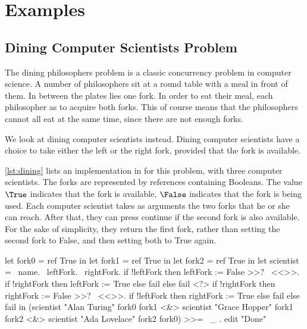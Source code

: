 
\section{Examples}
\label{sec:examples}

\subsection{Dining Computer Scientists Problem}

The dining philosophers problem is a classic concurrency problem in computer science.
A number of philosophers sit at a round table with a meal in front of them.
In between the plates lies one fork.
In order to eat their meal, each philosopher as to acquire both forks.
This of course means that the philosophers cannot all eat at the same time, since there are not enough forks.

We look at dining computer scientists instead.
Dining computer scientists have a choice to take either the left or the right fork, provided that the fork is available.

\cref{lst:dining} lists an implementation in \TOPHAT for this problem, with three computer scientists.
The forks are represented by references containing Booleans.
The value $\True$ indicates that the fork is available,
$\False$ indicates that the fork is being used.
Each computer scientist takes as arguments the two forks that he or she can reach.
After that, they can press continue if the second fork is also available.
For the sake of simplicity, they return the first fork, rather than setting the second fork to False, and then setting both to True again.

\begin{TASK}[
    float=ht,
    numbers=right,
    caption={Dining computer scientists problem with three computer scientists.},
    label=lst:dining]
  let fork0 = ref True in
  let fork1 = ref True in
  let fork2 = ref True in
  let scientist = \ name. \ leftFork. \ rightFork.
    if !leftFork
      then leftFork := False >>? \ <<>>.
        if !rightFork then leftFork := True else fail
      else fail
    <?>
    if !rightFork
      then rightFork := False >>? \ <<>>.
        if !leftFork then rightFork := True else fail
       else fail in
  (scientist "Alan Turing" fork0 fork1 <&>
  scientist "Grace Hopper" fork1 fork2 <&>
  scientist "Ada Lovelace" fork2 fork0) >>= \ _ .
    edit "Done"
\end{TASK}

